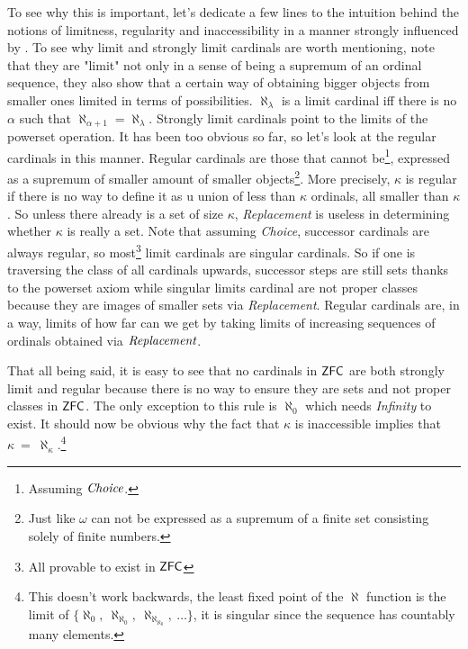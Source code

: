 \documentclass[12pt,a4paper]{article}
\begin{document}
To see why this is important, let's dedicate a few lines to the intuition behind the notions of limitness, regularity and inaccessibility in a manner strongly influenced by \cite{Infinity_in_mind}. To see why limit and strongly limit cardinals are worth mentioning, note that they are "limit" not only in a sense of being a supremum of an ordinal sequence, they also show that a certain way of obtaining bigger objects from smaller ones limited in terms of possibilities. $\aleph_\lambda$ is a limit cardinal iff there is no $\alpha$ such that $\aleph_{\alpha+1}=\aleph_\lambda$. Strongly limit cardinals point to the limits of the powerset operation. It has been too obvious so far, so let's look at the regular cardinals in this manner. Regular cardinals are those that cannot be\footnote{Assuming $\emph{Choice}$.}, expressed as a supremum of smaller amount of smaller objects\footnote{Just like $\omega$ can not be expressed as a supremum of a finite set consisting solely of finite numbers.}. More precisely, $\kappa$ is regular if there is no way to define it as u union of less than $\kappa$ ordinals, all smaller than $\kappa$. So unless there already is a set of size $\kappa$, \emph{Replacement} is useless in determining whether $\kappa$ is really a set. Note that assuming \emph{Choice}, successor cardinals are always regular, so most\footnote{All provable to exist in $\sf{ZFC}$} limit cardinals are singular cardinals. So if one is traversing the class of all cardinals upwards, successor steps are still sets thanks to the powerset axiom while singular limits cardinal are not proper classes because they are images of smaller sets via \emph{Replacement}. Regular cardinals are, in a way, limits of how far can we get by taking limits of increasing sequences of ordinals obtained via $\emph{Replacement}$.

That all being said, it is easy to see that no cardinals in $\sf{ZFC}$ are both strongly limit and regular because there is no way to ensure they are sets and not proper classes in $\sf{ZFC}$. The only exception to this rule is $\aleph_0$ which needs \emph{Infinity} to exist. %
It should now be obvious why the fact that $\kappa$ is inaccessible implies that $\kappa\ =\ \aleph_\kappa$.\footnote{This doesn't work backwards, the least fixed point of the $\aleph$ function is the limit of $\{\aleph_0,\ \aleph_{\aleph_0},\ \aleph_{\aleph_{\aleph_0}},\ \ldots \}$, it is singular since the sequence has countably many elements.}
\end{document}
